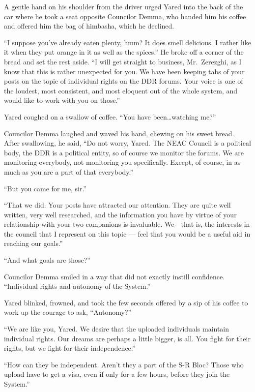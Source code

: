 A gentle hand on his shoulder from the driver urged Yared into the back of the car where he took a seat opposite Councilor Demma, who handed him his coffee and offered him the bag of himbasha, which he declined.

``I suppose you've already eaten plenty, hmm? It does smell delicious. I rather like it when they put orange in it as well as the spices.'' He broke off a corner of the bread and set the rest aside. ``I will get straight to business, Mr.~Zerezghi, as I know that this is rather unexpected for you. We have been keeping tabs of your posts on the topic of individual rights on the DDR forums. Your voice is one of the loudest, most consistent, and most eloquent out of the whole system, and would like to work with you on those.''

Yared coughed on a swallow of coffee. ``You have been\ldots watching me?''

Councilor Demma laughed and waved his hand, chewing on his sweet bread. After swallowing, he said, ``Do not worry, Yared. The NEAC Council is a political body, the DDR is a political entity, so of course we monitor the forums. We are monitoring everybody, not monitoring you specifically. Except, of course, in as much as you are a part of that everybody.''

``But you came for me, sir.''

``That we did. Your posts have attracted our attention. They are quite well written, very well researched, and the information you have by virtue of your relationship with your two companions is invaluable. We---that is, the interests in the council that I represent on this topic — feel that you would be a useful aid in reaching our goals.''

``And what goals are those?''

Councilor Demma smiled in a way that did not exactly instill confidence. ``Individual rights and autonomy of the System.''

Yared blinked, frowned, and took the few seconds offered by a sip of his coffee to work up the courage to ask, ``Autonomy?''

``We are like you, Yared. We desire that the uploaded individuals maintain individual rights. Our dreams are perhaps a little bigger, is all. You fight for their rights, but we fight for their independence.''

``How can they be independent. Aren't they a part of the S-R Bloc? Those who upload have to get a visa, even if only for a few hours, before they join the System.''

